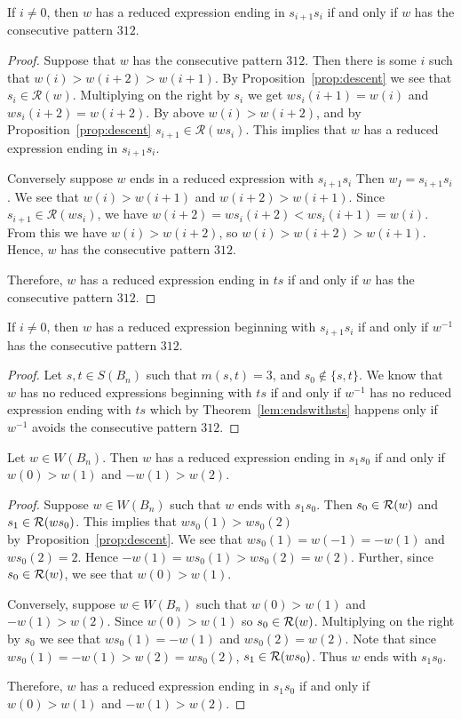 \begin{lemma}\label{lem:st}
If $i \neq 0$, then $w$ has a reduced expression ending in $s_{i+1}s_i$ if and only if $w$ has the consecutive pattern $312$.
\begin{proof}
	Suppose that $w$ has the consecutive pattern $312$.  Then there is some $i$ such that $w(i)>w(i+2)>w(i+1)$. By Proposition~\ref{prop:descent} we see that $s_i \in \mathcal{R}(w)$. Multiplying on the right by $s_i$ we get $ws_i(i+1)=w(i)$ and $ws_i(i+2)=w(i+2)$. By above $w(i)>w(i+2)$, and by Proposition~\ref{prop:descent} $s_{i+1} \in \mathcal{R}(ws_i)$. This implies that $w$ has a reduced expression ending in $s_{i+1}s_i$. 
	
	Conversely suppose $w$ ends in a reduced expression with $s_{i+1}s_i$ Then $w_I=s_{i+1}s_i$. We see that $w(i)>w(i+1)$ and $w(i+2)>w(i+1)$. Since $s_{i+1} \in \mathcal{R}(ws_i)$, we have $w(i+2)=ws_i(i+2)<ws_i(i+1)=w(i)$. From this we have $w(i)>w(i+2)$, so $w(i)>w(i+2)>w(i+1)$. Hence, $w$ has the consecutive pattern $312$. 
	
	Therefore, $w$ has a reduced expression ending in $ts$ if and only if $w$ has the consecutive pattern $312$.
\end{proof}
\end{lemma}

\begin{corollary}\label{lem:endswithts}
	If $i \neq 0$, then $w$ has a reduced expression beginning with $s_{i+1}s_i$ if and only if $w^{-1}$ has the consecutive pattern $312$.
	\begin{proof}
		Let $s,t \in S(B_n)$ such that $m(s,t)=3$, and $s_0 \notin\{s,t\}$. We know that $w$ has no reduced expressions beginning with $ts$ if and only if $w^{-1}$ has no reduced expression ending with $ts$ which by Theorem~\ref{lem:endswithsts} happens only if $w^{-1}$ avoids the consecutive pattern $312.$
	\end{proof}
\end{corollary}

\begin{lemma}\label{lem:endswiths0}
Let $w \in W(B_n)$. Then $w$ has a reduced expression ending in $s_1s_0$ if and only if $w(0)>w(1)$ and $-w(1)>w(2)$.
\begin{proof}
	Suppose $w \in W(B_n)$ such that $w$ ends with $s_1s_0$. Then $s_0 \in \mathcal{R}(w)$ and $s_1 \in \mathcal{R}(ws_0)$. This implies that $ws_0(1)>ws_0(2)$ by~Proposition~\ref{prop:descent}. We see that $ws_0(1)=w(-1)=-w(1)$ and $ws_0(2)=2$. Hence $-w(1)=ws_0(1)>ws_0(2)=w(2)$. Further, since $s_0 \in \mathcal{R}(w)$, we see that $w(0)>w(1)$.
	
	Conversely, suppose $w \in W(B_n)$ such that $w(0)>w(1)$ and $-w(1)>w(2)$. Since $w(0)>w(1)$ so $s_0 \in \mathcal{R}(w)$. Multiplying on the right by $s_0$ we see that $ws_0(1)=-w(1)$ and $ws_0(2)=w(2)$. Note that since $ws_0(1)=-w(1)>w(2)=ws_0(2)$, $s_1 \in \mathcal{R}(ws_0)$. Thus $w$ ends with $s_1s_0$. 
	
	Therefore, $w$ has a reduced expression ending in $s_1s_0$ if and only if $w(0)>w(1)$ and $-w(1)>w(2)$.
\end{proof}
\end{lemma}


